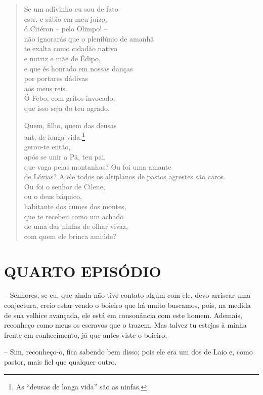 \begin{verse}Se um adivinho eu sou de fato\\ estr.
e sábio em meu juízo,\\
ó Citéron -- pelo Olimpo! --\\
não ignorarás que o plenilúnio de amanhã\\
te exalta como cidadão nativo\\ 
e nutriz e mãe de Édipo,\\
e que és honrado em nossas danças\\
por portares dádivas\\
aos meus reis.\\
Ó Febo, com gritos invocado,\\
que isso seja do teu agrado.

Quem, filho, quem das deusas\\ ant.
de longa vida,\footnote{As ``deusas de longa vida'' são as ninfas.}\\
gerou-te então,\\
após se unir a Pã, teu pai,\\ 
que vaga pelas montanhas? Ou foi uma amante\\
de Lóxias? A ele todos os altiplanos de pastos agrestes são caros.\\
Ou foi o senhor de Cilene,\\
ou o deus báquico,\\
habitante dos cumes dos montes,\\
que te recebeu como um achado\\
de uma das ninfas de olhar vivaz,\\
com quem ele brinca amiúde?
\end{verse}


\section{QUARTO EPISÓDIO}

 --    Senhores, se eu, que ainda não tive contato algum com ele, devo
arriscar uma conjectura, creio estar vendo o boieiro que há muito
buscamos, pois, na medida de sua velhice avançada, ele está em
consonância com este homem. Ademais, reconheço como meus os escravos que
o trazem. Mas talvez tu estejas à minha frente em conhecimento, já que
antes viste o boieiro.

 --   Sim, reconheço-o, fica sabendo bem disso; pois ele era um dos de Laio e,
como pastor, mais fiel que qualquer outro.

